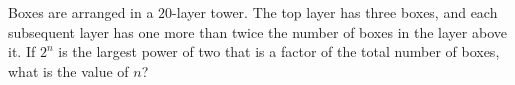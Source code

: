 Boxes are arranged in a $20$-layer tower. The top layer has three boxes, and each subsequent layer has one more than twice the number of boxes in the layer above it. If $2^n$ is the largest power of two that is a factor of the total number of boxes, what is the value of $n$?
